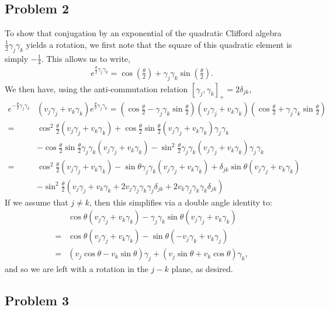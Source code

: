 \documentclass{../mathnotes}
\begin{document}
\subsection*{Problem 2}

To show that conjugation by an exponential of the quadratic Clifford algebra $\frac{1}{2}\gamma_j\gamma_k$ yields a rotation,
we first note that the square of this quadratic element is simply $-\frac{1}{4}$. This allows us to write, 
\begin{align*}
    e^{\frac{\theta}{2}\gamma_j\gamma_k}=\cos\left( \frac{\theta}{2} \right)+\gamma_j\gamma_k\sin\left( \frac{\theta}{2} \right).
\end{align*}
We then have, using the anti-commutation relation $[\gamma_j,\gamma_k]_+=2\delta_{jk}$,
\begin{align*}
    e^{-\frac{\theta}{2}\gamma_j\gamma_k}&(v_j\gamma_j+v_k\gamma_k)e^{\frac{\theta}{2}\gamma_j\gamma_k}=\left( \cos\frac{\theta}{2}-\gamma_j\gamma_k\sin\frac{\theta}{2} \right)
    \left(v_j\gamma_j+v_k\gamma_k  \right)\left( \cos\frac{\theta}{2}+\gamma_j\gamma_k\sin\frac{\theta}{2} \right)\\
    =&\cos^2\frac{\theta}{2}(v_j\gamma_j+v_k\gamma_k)+\cos\frac{\theta}{2}\sin\frac{\theta}{2}(v_j\gamma_j+v_k\gamma_k)\gamma_j\gamma_k\\
    &-\cos\frac{\theta}{2}\sin\frac{\theta}{2}\gamma_j\gamma_k(v_j\gamma_j+v_k\gamma_k)-\sin^2\frac{\theta}{2}\gamma_j\gamma_k(v_j\gamma_j+v_k\gamma_k)\gamma_j\gamma_k\\
    =&\cos^2\frac{\theta}{2}(v_j\gamma_j+v_k\gamma_k)-\sin\theta\gamma_j\gamma_k(v_j\gamma_j+v_k\gamma_k)+\delta_{jk}\sin\theta(v_j\gamma_j+v_k\gamma_k)\\
    &-\sin^2\frac{\theta}{2}(v_j\gamma_j+v_k\gamma_k+2v_j\gamma_j\gamma_k\gamma_j\delta_{jk}+2v_k\gamma_j\gamma_k\gamma_k\delta_{jk})
\end{align*}
If we assume that $j\neq k$, then this simplifies via a double angle identity to:
\begin{align*}
    &\cos\theta(v_j\gamma_j+v_k\gamma_k)-\gamma_j\gamma_k\sin\theta(v_j\gamma_j+v_k\gamma_k)\\
    =&\cos\theta(v_j\gamma_j+v_k\gamma_k)-\sin\theta(-v_j\gamma_k+v_k\gamma_j)\\
    =&(v_j\cos\theta-v_k\sin\theta)\gamma_j+(v_j\sin\theta+v_k\cos\theta)\gamma_k,
\end{align*}
and so we are left with a rotation in the $j-k$ plane, as desired.

\subsection*{Problem 3}
\end{document}
